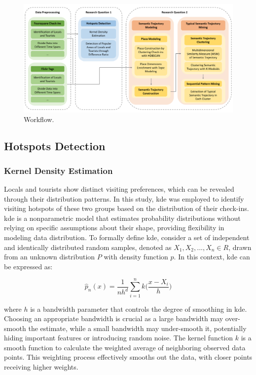 \documentclass{article}
\theoremstyle{definition}
\theoremstyle{remark}
\begin{document}
\begin{figure}[h!]
\centering
\includegraphics[width=1\textwidth]{figures/workflow.png}
\caption{\label{fig:workflow}Workflow.}
\end{figure}


\subsection{Hotspots Detection}\label{hotspots_detection}

\subsubsection{Kernel Density Estimation}
Locals and tourists show distinct visiting preferences, which can be revealed through their distribution patterns. In this study, \acrfull{kde} was employed to identify visiting hotspots of these two groups based on the distribution of their check-ins. \acrshort{kde} is a nonparametric model that estimates probability distributions without relying on specific assumptions about their shape, providing flexibility in modeling data distribution. To formally define \acrshort{kde}, consider a set of independent and identically distributed random samples, denoted as $X_{1}, X_{2}, ..., X_{n} \in R$, drawn from an unknown distribution $P$ with density function $p$. In this context, \acrshort{kde} can be expressed as:

\begin{equation} \label{eq:kde}
\hat{p}_{n}(x) = \frac{1}{nh^{d}} \sum_{i=1}^n k\bigg(\frac{x-X_i}{h}\bigg)
\end{equation}

where $h$ is a bandwidth parameter that controls the degree of smoothing in \acrshort{kde}. Choosing an appropriate bandwidth is crucial as a large bandwidth may over-smooth the estimate, while a small bandwidth may under-smooth it, potentially hiding important features or introducing random noise. The kernel function $k$ is a smooth function to calculate the weighted average of neighboring observed data points. This weighting process effectively smooths out the data, with closer points receiving higher weights.
\end{document}
